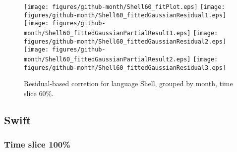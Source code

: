 \begin{figure}[t]
\centering
{}
{\texttt{[image: figures/github-month/Shell60\_fitPlot.eps]}}
{\texttt{[image: figures/github-month/Shell60\_fittedGaussianResidual1.eps]}}
{\texttt{[image: figures/github-month/Shell60\_fittedGaussianPartialResult1.eps]}}
{\texttt{[image: figures/github-month/Shell60\_fittedGaussianResidual2.eps]}}
{\texttt{[image: figures/github-month/Shell60\_fittedGaussianPartialResult2.eps]}}
{\texttt{[image: figures/github-month/Shell60\_fittedGaussianResidual3.eps]}}
\caption{Residual-based corretion for language Shell, grouped by month, time slice 60\%.}
\end{figure}


\FloatBarrier


\subsection{Swift}

\subsubsection{Time slice 100\%}

